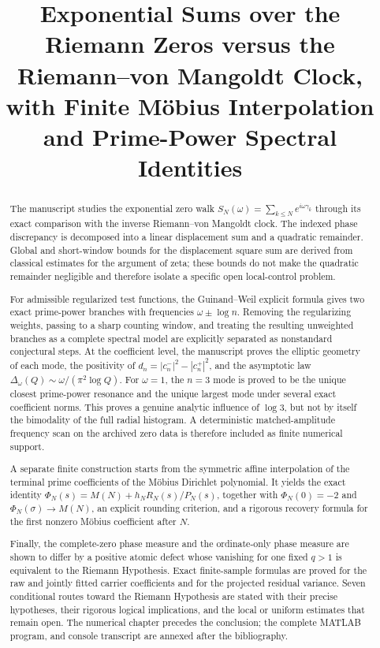 \documentclass[11pt]{amsart}
\title[Exponential Zeta Walks and Prime-Power Identities]{
Exponential Sums over the Riemann Zeros versus the
Riemann--von Mangoldt Clock, with Finite Möbius Interpolation
and Prime-Power Spectral Identities
}
\author{}
\date{}
\numberwithin{equation}{section}
\theoremstyle{plain}
\theoremstyle{definition}
\theoremstyle{remark}
\newcommand{\1}{\mathbf{1}}
\begin{document}
\begin{abstract}
The manuscript studies the exponential zero walk
\(S_N(\omega)=\sum_{k\leq N}e^{i\omega\gamma_k}\) through its exact
comparison with the inverse Riemann--von Mangoldt clock.  The indexed phase
discrepancy is decomposed into a linear displacement sum and a quadratic
remainder.  Global and short-window bounds for the displacement square sum
are derived from classical estimates for the argument of zeta; these bounds
do not make the quadratic remainder negligible and therefore isolate a
specific open local-control problem.

For admissible regularized test functions, the Guinand--Weil explicit formula
gives two exact prime-power branches with frequencies
\(\omega\pm\log n\).  Removing the regularizing weights, passing to a sharp
counting window, and treating the resulting unweighted branches as a complete
spectral model are explicitly separated as nonstandard conjectural steps.  At
the coefficient level, the manuscript proves the elliptic geometry of each
mode, the positivity of
\(d_n=|c_n^-|^2-|c_n^+|^2\), and the asymptotic law
\(\Delta_\omega(Q)\sim\omega/(\pi^2\log Q)\).  For \(\omega=1\), the
\(n=3\) mode is proved to be the unique closest prime-power resonance and
the unique largest mode under several exact coefficient norms.  This proves
a genuine analytic influence of \(\log3\), but not by itself the bimodality
of the full radial histogram.  A deterministic matched-amplitude frequency
scan on the archived zero data is therefore included as finite numerical
support.

A separate finite construction starts from the symmetric affine interpolation
of the terminal prime coefficients of the Möbius Dirichlet polynomial.  It yields the exact identity
\(\Phi_N(s)=M(N)+h_NR_N(s)/P_N(s)\), together with
\(\Phi_N(0)=-2\) and \(\Phi_N(\sigma)\to M(N)\), an explicit
rounding criterion, and a rigorous recovery formula
for the first nonzero Möbius coefficient after \(N\).

Finally, the complete-zero phase measure and the ordinate-only phase measure
are shown to differ by a positive atomic defect whose vanishing for one fixed
\(q>1\) is equivalent to the Riemann Hypothesis.  Exact finite-sample formulas
are proved for the raw and jointly fitted carrier coefficients and for the
projected residual variance.  Seven conditional routes toward the Riemann
Hypothesis are stated with their precise hypotheses, their rigorous logical
implications, and the local or uniform estimates that remain open.  The
numerical chapter precedes the conclusion; the complete MATLAB program,
and console transcript are annexed after the bibliography.
\end{abstract}
\end{document}
